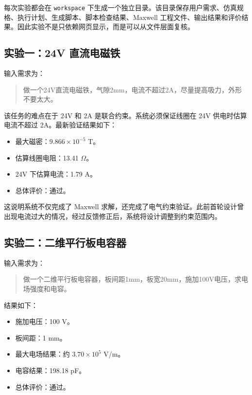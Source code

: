 \documentclass[12pt,a4paper]{ctexart}
\begin{document}
每次实验都会在 \texttt{workspace} 下生成一个独立目录。该目录保存用户需求、仿真规格、执行计划、生成脚本、脚本检查结果、Maxwell 工程文件、输出结果和评价结果。因此实验不是只依赖网页显示，而是可以从文件层面复核。

\subsection{实验一：24V 直流电磁铁}

输入需求为：

\begin{quote}
做一个24V直流电磁铁，气隙2mm，电流不超过2A，尽量提高吸力，外形不要太大。
\end{quote}

该任务的难点在于 24V 和 2A 是联合约束。系统必须保证线圈在 24V 供电时估算电流不超过 2A。最新验证结果如下：

\begin{itemize}
  \item 最大磁密：$9.866\times 10^{-5}$ T。
  \item 估算线圈电阻：13.41 $\Omega$。
  \item 24V 下估算电流：1.79 A。
  \item 总体评价：通过。
\end{itemize}

这说明系统不仅完成了 Maxwell 求解，还完成了电气约束验证。此前首轮设计曾出现电流过大的情况，经过反馈修正后，系统将设计调整到约束范围内。

\subsection{实验二：二维平行板电容器}

输入需求为：

\begin{quote}
做一个二维平行板电容器，板间距1mm，板宽20mm，施加100V电压，求电场强度和电容。
\end{quote}

结果如下：

\begin{itemize}
  \item 施加电压：100 V。
  \item 板间距：1 mm。
  \item 最大电场结果：约 $3.70\times 10^{5}$ V/m。
  \item 电容结果：198.18 pF。
  \item 总体评价：通过。
\end{itemize}
\end{document}
